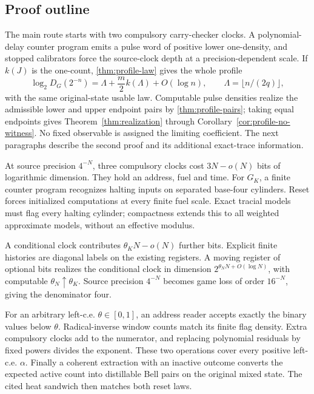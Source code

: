\subsection{Proof outline}
The main route starts with two compulsory carry-checker clocks. A polynomial-delay counter program emits a pulse word of positive lower one-density, and stopped calibrators force the source-clock depth at a precision-dependent scale. If $k(J)$ is the one-count, \cref{thm:profile-law} gives the whole profile
\[
 \log_2D_G(2^{-n})=\Lambda+\frac m2k(\Lambda)+O(\log n),
 \qquad\Lambda=\lfloor n/(2q)\rfloor,
\]
with the same original-state usable law. Computable pulse densities realize the admissible lower and upper endpoint pairs by \cref{thm:profile-pairs}; taking equal endpoints gives Theorem~\ref{thm:realization} through Corollary~\ref{cor:profile-no-witness}. No fixed observable is assigned the limiting coefficient. The next paragraphs describe the second proof and its additional exact-trace information.

At source precision $4^{-N}$, three compulsory clocks cost $3N-o(N)$ bits of logarithmic dimension. They hold an address, fuel and time. For $G_K$, a finite counter program recognizes halting inputs on separated base-four cylinders. Reset forces initialized computations at every finite fuel scale. Exact tracial models must flag every halting cylinder; compactness extends this to all weighted approximate models, without an effective modulus.

A conditional clock contributes $\theta_KN-o(N)$ further bits. Explicit finite histories are diagonal labels on the existing registers. A moving register of optional bits realizes the conditional clock in dimension $2^{\theta_NN+O(\log N)}$, with computable $\theta_N\uparrow\theta_K$. Source precision $4^{-N}$ becomes game loss of order $16^{-N}$, giving the denominator four.

For an arbitrary left-c.e. $\theta\in[0,1]$, an address reader accepts exactly the binary values below $\theta$. Radical-inverse window counts match its finite flag density. Extra compulsory clocks add to the numerator, and replacing polynomial residuals by fixed powers divides the exponent. These two operations cover every positive left-c.e. $\alpha$. Finally a coherent extraction with an inactive outcome converts the expected active count into distillable Bell pairs on the original mixed state. The cited heat sandwich then matches both reset laws.


